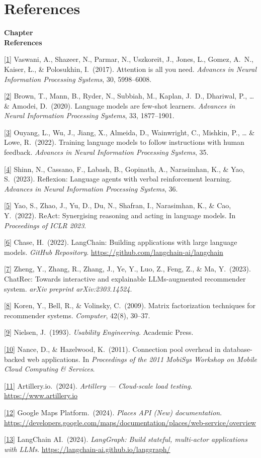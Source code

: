 \documentclass[12pt,a4paper]{report}
\newcommand{\refentry}[2]{\noindent\hypertarget{ref:#1}{}\hangindent=1.3cm\hangafter=1 \hyperlink{cite:#1}{[#1]} #2\par}
\newcommand{\chaptercontentheading}[1]{%
  \thispagestyle{mainstyle}%
  \begin{center}
    {\Large\bfseries Chapter~\thechapter}\\[0.35cm]
    {\Large\bfseries #1}
  \end{center}
  \vspace{0.9cm}
}
\begin{document}
\chapter{References}
\chaptercontentheading{References}

\begingroup
\setlength{\parindent}{0pt}
\setlength{\parskip}{0.45\baselineskip}

\refentry{1}{Vaswani, A., Shazeer, N., Parmar, N., Uszkoreit, J., Jones, L., Gomez, A.\ N., Kaiser, \L., \& Polosukhin, I.\ (2017). Attention is all you need. \textit{Advances in Neural Information Processing Systems}, 30, 5998--6008.}
\refentry{2}{Brown, T., Mann, B., Ryder, N., Subbiah, M., Kaplan, J.\ D., Dhariwal, P., \ldots{} \& Amodei, D.\ (2020). Language models are few-shot learners. \textit{Advances in Neural Information Processing Systems}, 33, 1877--1901.}
\refentry{3}{Ouyang, L., Wu, J., Jiang, X., Almeida, D., Wainwright, C., Mishkin, P., \ldots{} \& Lowe, R.\ (2022). Training language models to follow instructions with human feedback. \textit{Advances in Neural Information Processing Systems}, 35.}
\refentry{4}{Shinn, N., Cassano, F., Labash, B., Gopinath, A., Narasimhan, K., \& Yao, S.\ (2023). Reflexion: Language agents with verbal reinforcement learning. \textit{Advances in Neural Information Processing Systems}, 36.}
\refentry{5}{Yao, S., Zhao, J., Yu, D., Du, N., Shafran, I., Narasimhan, K., \& Cao, Y.\ (2022). ReAct: Synergising reasoning and acting in language models. In \textit{Proceedings of ICLR 2023}.}
\refentry{6}{Chase, H.\ (2022). LangChain: Building applications with large language models. \textit{GitHub Repository}. \url{https://github.com/langchain-ai/langchain}}
\refentry{7}{Zheng, Y., Zhang, R., Zhang, J., Ye, Y., Luo, Z., Feng, Z., \& Ma, Y.\ (2023). ChatRec: Towards interactive and explainable LLMs-augmented recommender system. \textit{arXiv preprint arXiv:2303.14524}.}
\refentry{8}{Koren, Y., Bell, R., \& Volinsky, C.\ (2009). Matrix factorization techniques for recommender systems. \textit{Computer}, 42(8), 30--37.}
\refentry{9}{Nielsen, J.\ (1993). \textit{Usability Engineering}. Academic Press.}
\refentry{10}{Nance, D., \& Hazelwood, K.\ (2011). Connection pool overhead in database-backed web applications. In \textit{Proceedings of the 2011 MobiSys Workshop on Mobile Cloud Computing \& Services}.}
\refentry{11}{Artillery.io.\ (2024). \textit{Artillery --- Cloud-scale load testing}. \url{https://www.artillery.io}}
\refentry{12}{Google Maps Platform.\ (2024). \textit{Places API (New) documentation}. \url{https://developers.google.com/maps/documentation/places/web-service/overview}}
\refentry{13}{LangChain AI.\ (2024). \textit{LangGraph: Build stateful, multi-actor applications with LLMs}. \url{https://langchain-ai.github.io/langgraph/}}
\end{document}

